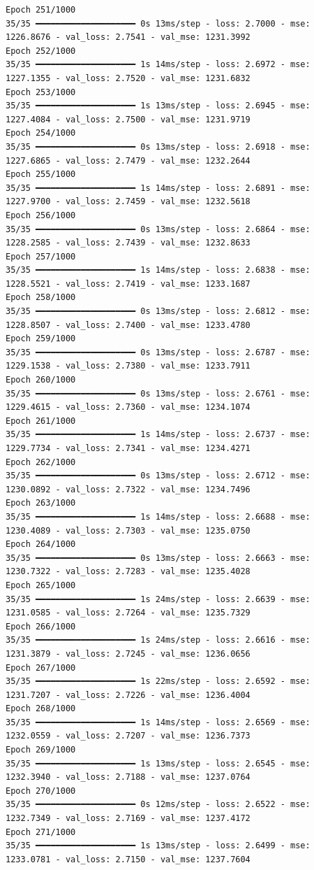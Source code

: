 \documentclass[
  letterpaper,
  DIV=11,
  numbers=noendperiod]{scrreprt}
\begin{document}
\begin{verbatim}
Epoch 251/1000
35/35 ━━━━━━━━━━━━━━━━━━━━ 0s 13ms/step - loss: 2.7000 - mse: 1226.8676 - val_loss: 2.7541 - val_mse: 1231.3992
Epoch 252/1000
35/35 ━━━━━━━━━━━━━━━━━━━━ 1s 14ms/step - loss: 2.6972 - mse: 1227.1355 - val_loss: 2.7520 - val_mse: 1231.6832
Epoch 253/1000
35/35 ━━━━━━━━━━━━━━━━━━━━ 1s 13ms/step - loss: 2.6945 - mse: 1227.4084 - val_loss: 2.7500 - val_mse: 1231.9719
Epoch 254/1000
35/35 ━━━━━━━━━━━━━━━━━━━━ 0s 13ms/step - loss: 2.6918 - mse: 1227.6865 - val_loss: 2.7479 - val_mse: 1232.2644
Epoch 255/1000
35/35 ━━━━━━━━━━━━━━━━━━━━ 1s 14ms/step - loss: 2.6891 - mse: 1227.9700 - val_loss: 2.7459 - val_mse: 1232.5618
Epoch 256/1000
35/35 ━━━━━━━━━━━━━━━━━━━━ 0s 13ms/step - loss: 2.6864 - mse: 1228.2585 - val_loss: 2.7439 - val_mse: 1232.8633
Epoch 257/1000
35/35 ━━━━━━━━━━━━━━━━━━━━ 1s 14ms/step - loss: 2.6838 - mse: 1228.5521 - val_loss: 2.7419 - val_mse: 1233.1687
Epoch 258/1000
35/35 ━━━━━━━━━━━━━━━━━━━━ 0s 13ms/step - loss: 2.6812 - mse: 1228.8507 - val_loss: 2.7400 - val_mse: 1233.4780
Epoch 259/1000
35/35 ━━━━━━━━━━━━━━━━━━━━ 0s 13ms/step - loss: 2.6787 - mse: 1229.1538 - val_loss: 2.7380 - val_mse: 1233.7911
Epoch 260/1000
35/35 ━━━━━━━━━━━━━━━━━━━━ 0s 13ms/step - loss: 2.6761 - mse: 1229.4615 - val_loss: 2.7360 - val_mse: 1234.1074
Epoch 261/1000
35/35 ━━━━━━━━━━━━━━━━━━━━ 1s 14ms/step - loss: 2.6737 - mse: 1229.7734 - val_loss: 2.7341 - val_mse: 1234.4271
Epoch 262/1000
35/35 ━━━━━━━━━━━━━━━━━━━━ 0s 13ms/step - loss: 2.6712 - mse: 1230.0892 - val_loss: 2.7322 - val_mse: 1234.7496
Epoch 263/1000
35/35 ━━━━━━━━━━━━━━━━━━━━ 1s 14ms/step - loss: 2.6688 - mse: 1230.4089 - val_loss: 2.7303 - val_mse: 1235.0750
Epoch 264/1000
35/35 ━━━━━━━━━━━━━━━━━━━━ 0s 13ms/step - loss: 2.6663 - mse: 1230.7322 - val_loss: 2.7283 - val_mse: 1235.4028
Epoch 265/1000
35/35 ━━━━━━━━━━━━━━━━━━━━ 1s 24ms/step - loss: 2.6639 - mse: 1231.0585 - val_loss: 2.7264 - val_mse: 1235.7329
Epoch 266/1000
35/35 ━━━━━━━━━━━━━━━━━━━━ 1s 24ms/step - loss: 2.6616 - mse: 1231.3879 - val_loss: 2.7245 - val_mse: 1236.0656
Epoch 267/1000
35/35 ━━━━━━━━━━━━━━━━━━━━ 1s 22ms/step - loss: 2.6592 - mse: 1231.7207 - val_loss: 2.7226 - val_mse: 1236.4004
Epoch 268/1000
35/35 ━━━━━━━━━━━━━━━━━━━━ 1s 14ms/step - loss: 2.6569 - mse: 1232.0559 - val_loss: 2.7207 - val_mse: 1236.7373
Epoch 269/1000
35/35 ━━━━━━━━━━━━━━━━━━━━ 1s 13ms/step - loss: 2.6545 - mse: 1232.3940 - val_loss: 2.7188 - val_mse: 1237.0764
Epoch 270/1000
35/35 ━━━━━━━━━━━━━━━━━━━━ 0s 12ms/step - loss: 2.6522 - mse: 1232.7349 - val_loss: 2.7169 - val_mse: 1237.4172
Epoch 271/1000
35/35 ━━━━━━━━━━━━━━━━━━━━ 1s 13ms/step - loss: 2.6499 - mse: 1233.0781 - val_loss: 2.7150 - val_mse: 1237.7604

\end{verbatim}
\end{document}
